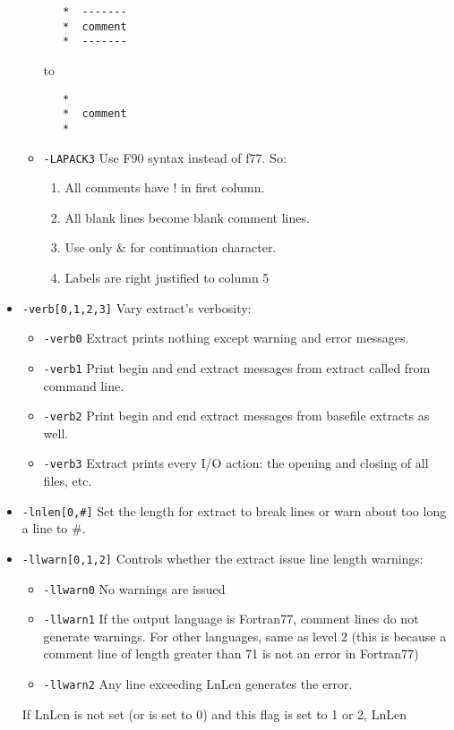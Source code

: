 \begin{itemize}
\begin{itemize}
\begin{verbatim}
   *  -------
   *  comment
   *  -------
\end{verbatim}
 to
\begin{verbatim}
   *  
   *  comment
   * 
\end{verbatim}
   \item {\tt -LAPACK3} Use F90 syntax instead of f77.  So:
       \begin{enumerate}
       \item All comments have ! in first column.
       \item All blank lines become blank comment lines.
       \item Use only \& for continuation character.
       \item Labels are right justified to column 5
       \end{enumerate}
   \end{itemize}
\item {\tt -verb[0,1,2,3]} Vary extract's verbosity:
   \begin{itemize}
   \item {\tt -verb0} Extract prints nothing except warning and error messages.
   \item {\tt -verb1} Print begin and end extract messages from extract
   called from command line.
   \item {\tt -verb2} Print begin and end extract messages from basefile extracts
   as well.
   \item {\tt -verb3} Extract prints every I/O action: the opening and closing of
   all files, etc.
   \end{itemize}
\item {\tt -lnlen[0,\#]}  Set the length for extract to break lines or warn
about too long a line to \#.
\item {\tt -llwarn[0,1,2]}  Controls whether the extract issue line length warnings:
   \begin{itemize}
   \item {\tt -llwarn0} No warnings are issued
   \item {\tt -llwarn1} If the output language is Fortran77, comment lines do
                        not generate warnings.  For other languages, same as
                        level 2 (this is because a comment line of length
                        greater than 71 is not an error in Fortran77)
   \item {\tt -llwarn2} Any line exceeding LnLen generates the error.
   \end{itemize}
   If LnLen is not set (or is set to 0) and this flag is set to 1 or 2, LnLen

\end{itemize}
